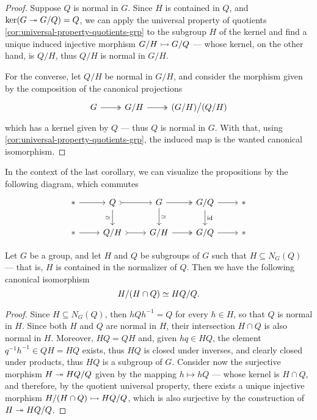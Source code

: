 \begin{proof}
Suppose \(Q\) is normal in \(G\). Since \(H\) is contained in \(Q\), and \(\ker(G
\twoheadrightarrow G/Q) = Q\), we can apply the universal property of quotients
\cref{cor:universal-property-quotients-grp} to the subgroup \(H\) of the kernel
and find a unique induced injective morphism \(G/H \rightarrowtail G/Q\) --- whose kernel,
on the other hand, is \(Q/H\), thus \(Q/H\) is normal in \(G/H\).

For the converse, let \(Q/H\) be normal in \(G/H\), and consider the morphism
given by the composition of the canonical projections
\[
  \begin{tikzcd}
    G \ar[r, two heads] &G/H \ar[r, two heads] &(G/H) \big/ (Q/H)
  \end{tikzcd}
\]
which has a kernel given by \(Q\) --- thus \(Q\) is normal in \(G\). With that,
using \cref{cor:universal-property-quotients-grp}, the induced map is the wanted
canonical isomorphism.
\end{proof}

In the context of the last corollary, we can visualize the propositions by the
following diagram, which commutes
\[
  \begin{tikzcd}
    * \ar[r] &Q \ar[r, tail] \ar[d, "\iso"']
    &G \ar[r, two heads] \ar[d, "\iso"]
    &G/Q \ar[r] \ar[d, "\Id"] &*
    \\
    * \ar[r] &Q/H \ar[r, tail] &G/H \ar[r, two heads] &G/Q \ar[r] &*
  \end{tikzcd}
\]

\begin{corollary}
\label{cor:grp-intersection-coset-isomorphism}
Let \(G\) be a group, and let \(H\) and \(Q\) be subgroups of \(G\) such that
\(H \subseteq N_G(Q)\) --- that is, \(H\) is contained in the normalizer of
\(Q\). Then we have the following canonical isomorphism
\[
  H/(H \cap Q) \simeq H Q / Q.
\]
\end{corollary}

\begin{proof}
Since \(H \subseteq N_G(Q)\), then \(hQh^{-1} = Q\) for every \(h \in H\), so
that \(Q\) is normal in \(H\). Since both \(H\) and \(Q\) are normal in \(H\),
their intersection \(H \cap Q\) is also normal in \(H\). Moreover, \(HQ = QH\)
and, given \(hq \in HQ\), the element \(q^{-1} h^{-1} \in Q H = H Q\) exists, thus
\(HQ\) is closed under inverses, and clearly closed under products, thus \(HQ\)
is a subgroup of \(G\). Consider now the surjective morphism \(H \twoheadrightarrow H Q / Q\)
given by the mapping \(h \mapsto h Q\) --- whose kernel is \(H \cap Q\), and
therefore, by the quotient universal property, there exists a unique injective
morphism \(H/(H \cap Q) \rightarrowtail HQ/Q\), which is also surjective by the
construction of \(H \twoheadrightarrow H Q / Q\).
\end{proof}

